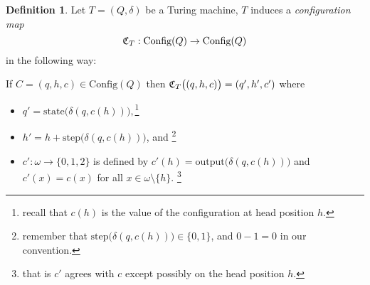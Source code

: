 \documentclass[12pt, a4paper]{amsart}
\theoremstyle{definition}
\newtheorem{definition}[lemma]{Definition}
\newcommand{\C}{\text{Config}}
\begin{document}
\begin{definition}
    Let $T=(Q,\delta)$ be a Turing machine, $T$ induces a {\em configuration
    map} $${\frak C}_T: \C(Q)\to \C(Q)$$ in the following way:

    If $C = (q,h,c)\in \C(Q)$ then ${\frak C}_T\big((q,h,c)\big) = (q', h', c')$
    where
    \begin{itemize}
        \item $q' = \text{state}\big(\delta(q, c(h))\big), $\footnote{recall
            that $c(h)$ is the value of the configuration at head position $h$.}
        \item $h' = h + \text{step}\big(\delta(q, c(h))\big)$, and 
            \footnote{remember that $\text{step}\big(\delta(q,c(h))\big)\in\{0,1\}$, and $0 - 1 = 0$ in
            our convention.}
        \item $c': \omega \to \{0,1,2\}$ is defined by $c'(h) = \text{output}\big(\delta(q, c(h))\big)$
            and $c'(x) = c(x)$ for all $x\in \omega\setminus \{h\}$. 
            \footnote{that is $c'$ agrees 
            with $c$ except possibly on the head position $h$.}
    \end{itemize}

\end{definition}
\end{document}
